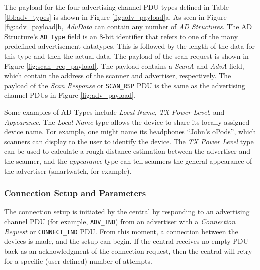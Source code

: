 The payload for the four advertising channel PDU types defined in Table \ref{tbl:adv_types} is shown in Figure \ref{fig:adv_payload}a. As seen in Figure \ref{fig:adv_payload}b, \textit{AdvData} can contain any number of \textit{AD Structures}. The AD Structure's \texttt{AD Type} field is an 8-bit identifier that refers to one of the many predefined advertisement datatypes. This is followed by the length of the data for this type and then the actual data. The payload of the scan request is shown in Figure \ref{fig:scan_req_payload}. The payload contains a \textit{ScanA} and \textit{AdvA} field, which contain the address of the scanner and advertiser, respectively. The payload of the \textit{Scan Response} or \texttt{SCAN\_RSP} PDU is the same as the advertising channel PDUs in Figure \ref{fig:adv_payload}.

Some examples of AD Types include \textit{Local Name}, \textit{TX Power Level}, and \textit{Appearance}. The \textit{Local Name} type allows the device to share its locally assigned device name. For example, one might name its headphones ``John's oPods'', which scanners can display to the user to identify the device. The \textit{TX Power Level} type can be used to calculate a rough distance estimation between the advertiser and the scanner, and the \textit{appearance} type can tell scanners the general appearance of the advertiser (smartwatch, for example).

\subsubsection{Connection Setup and Parameters}
The connection setup is initiated by the central by responding to an advertising channel PDU (for example, \texttt{ADV\_IND}) from an advertiser with a \textit{Connection Request} or \texttt{CONNECT\_IND} PDU. From this moment, a connection between the devices is made, and the setup can begin. If the central receives no empty PDU back as an acknowledgment of the connection request, then the central will retry for a specific (user-defined) number of attempts.

\newcommand{\bitboxsmalltext}[2]{%
    \bitbox{#1}{\fontsize{5}{5}\selectfont#2}%
}

